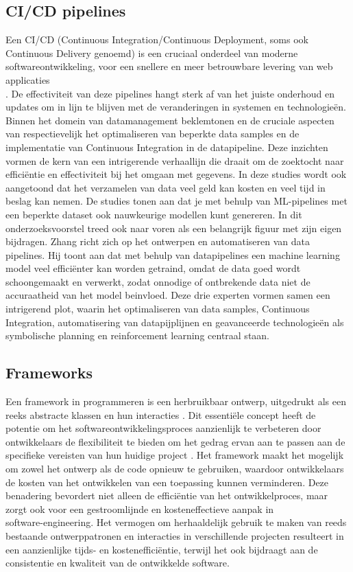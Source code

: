 \subsection{CI/CD pipelines}
Een CI/CD (Continuous Integration/Continuous Deployment, soms ook Continuous Delivery genoemd) is een cruciaal onderdeel van moderne softwareontwikkeling, voor een snellere en meer betrouwbare levering van web applicaties\\ \autocite{Singh2023}.
De effectiviteit van deze pipelines hangt sterk af van het juiste onderhoud en updates om in lijn te blijven met de veranderingen in systemen en technologieën.
Binnen het domein van datamanagement beklemtonen \autocite{Samad2018} en \autocite{RMV2020} de cruciale aspecten van respectievelijk het optimaliseren van beperkte data samples en de implementatie van Continuous Integration in de datapipeline.
Deze inzichten vormen de kern van een intrigerende verhaallijn die draait om de zoektocht naar efficiëntie en effectiviteit bij het omgaan met gegevens. In deze studies wordt ook aangetoond dat het verzamelen van data veel geld kan kosten en veel tijd in beslag kan nemen. De studies tonen aan dat je met behulp van ML-pipelines met een beperkte dataset ook nauwkeurige modellen kunt genereren.
In dit onderzoeksvoorstel treed ook \parencite{Zhang2022} naar voren als een belangrijk figuur met zijn eigen bijdragen.
Zhang richt zich op het ontwerpen en automatiseren van data pipelines. Hij toont aan dat met behulp van datapipelines een machine learning model veel efficiënter kan worden getraind, omdat de data goed wordt schoongemaakt en verwerkt, zodat onnodige of ontbrekende data niet de accuraatheid van het model beinvloed.
Deze drie experten vormen samen een intrigerend plot, waarin het optimaliseren van data samples, Continuous Integration, automatisering van datapijplijnen en geavanceerde technologieën als symbolische planning en reinforcement learning centraal staan. 
\subsection{Frameworks}
Een framework in programmeren is een herbruikbaar ontwerp, uitgedrukt als een reeks abstracte klassen en hun interacties \autocite{JuhaHautamaeki1997}. Dit essentiële concept heeft de potentie om het softwareontwikkelingsproces aanzienlijk te verbeteren door ontwikkelaars de flexibiliteit te bieden om het gedrag ervan aan te passen aan de specifieke vereisten van hun huidige project \autocite{JuhaHautamaeki1997}. Het framework maakt het mogelijk om zowel het ontwerp als de code opnieuw te gebruiken, waardoor ontwikkelaars de kosten van het ontwikkelen van een toepassing kunnen verminderen. Deze benadering bevordert niet alleen de efficiëntie van het ontwikkelproces, maar zorgt ook voor een gestroomlijnde en kosteneffectieve aanpak in \\software-engineering. Het vermogen om herhaaldelijk gebruik te maken van reeds bestaande ontwerppatronen en interacties in verschillende projecten resulteert in een aanzienlijke tijds- en kostenefficiëntie, terwijl het ook bijdraagt aan de consistentie en kwaliteit van de ontwikkelde software.
